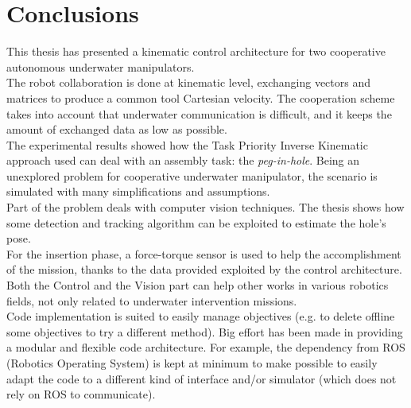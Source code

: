 \chapter{Conclusions}
\label{chap:conclusions}
\ifpdf
    \graphicspath{{Conclusions/Figures/PNG/}{Conclusions/Figures/PDF/}{Conclusions/Figures/}}
\else
    \graphicspath{{Conclusions/Figures/EPS/}{Conclusions/Figures/}}
\fi

This thesis has presented a kinematic control architecture for two cooperative autonomous underwater manipulators.\\
The robot collaboration is done at kinematic level, exchanging vectors and matrices to produce a common tool Cartesian velocity. The cooperation scheme takes into account that underwater communication is difficult, and it keeps the amount of exchanged data as low as possible.\\
The experimental results showed how the Task Priority Inverse Kinematic approach used can deal with an assembly task: the \textit{peg-in-hole}. Being an unexplored problem for cooperative underwater manipulator, the scenario is simulated with many simplifications and assumptions.\\
Part of the problem deals with computer vision techniques. The thesis shows how some detection and tracking algorithm can be exploited to estimate the hole's pose.\\
For the insertion phase, a force-torque sensor is used to help the accomplishment of the mission, thanks to the data provided exploited by the control architecture.\\
Both the Control and the Vision part can help other works in various robotics fields, not only related to underwater intervention missions.\\

Code implementation is suited to easily manage objectives (e.g. to delete offline some objectives to try a different method). Big effort has been made in providing a modular and flexible code architecture. For example, the dependency from ROS (Robotics Operating System) is kept at minimum to make possible to easily adapt the code to a different kind of interface and/or simulator (which does not rely on ROS to communicate).\\


